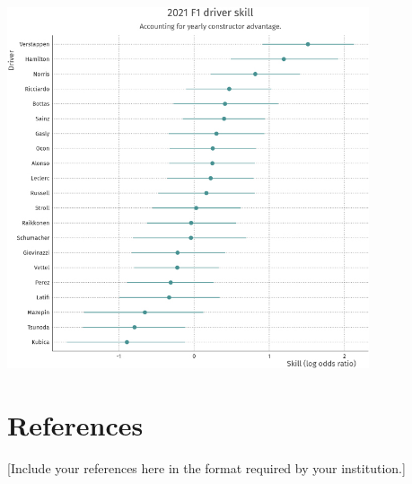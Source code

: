 \documentclass[12pt]{article}
\begin{document}
\begin{center}
    \includegraphics[width=0.8\textwidth]{driver skill.jpg}
    \end{center}

\newpage
\section*{References}
[Include your references here in the format required by your institution.]
\end{document}
